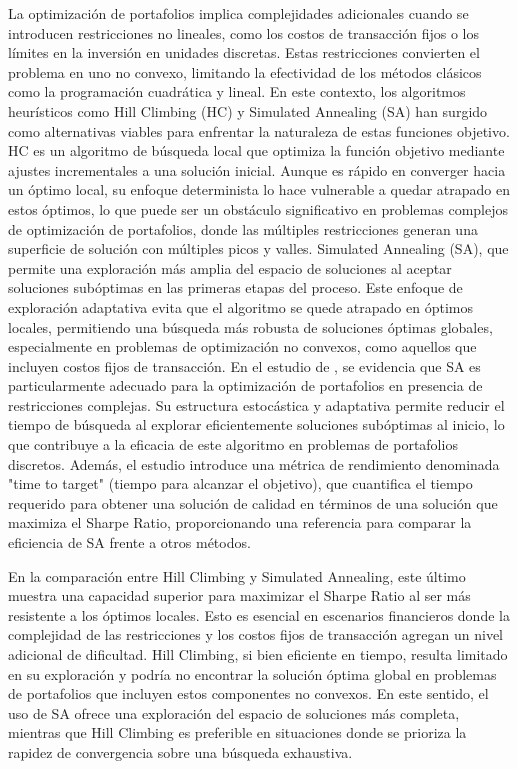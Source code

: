 \documentclass[9pt,a4paper,twoside]{rho-class/rho}
\begin{document}
        La optimización de portafolios implica complejidades adicionales cuando se introducen restricciones no lineales, como los costos de transacción fijos o los límites en la inversión en unidades discretas. Estas restricciones convierten el problema en uno no convexo, limitando la efectividad de los métodos clásicos como la programación cuadrática y lineal. En este contexto, los algoritmos heurísticos como Hill Climbing (HC) y Simulated Annealing (SA) han surgido como alternativas viables para enfrentar la naturaleza de estas funciones objetivo. HC es un algoritmo de búsqueda local que optimiza la función objetivo mediante ajustes incrementales a una solución inicial. Aunque es rápido en converger hacia un óptimo local, su enfoque determinista lo hace vulnerable a quedar atrapado en estos óptimos, lo que puede ser un obstáculo significativo en problemas complejos de optimización de portafolios, donde las múltiples restricciones generan una superficie de solución con múltiples picos y valles. Simulated Annealing (SA), que permite una exploración más amplia del espacio de soluciones al aceptar soluciones subóptimas en las primeras etapas del proceso. Este enfoque de exploración adaptativa evita que el algoritmo se quede atrapado en óptimos locales, permitiendo una búsqueda más robusta de soluciones óptimas globales, especialmente en problemas de optimización no convexos, como aquellos que incluyen costos fijos de transacción. En el estudio de \cite{Rubio-Garcia2022}, se evidencia que SA es particularmente adecuado para la optimización de portafolios en presencia de restricciones complejas. Su estructura estocástica y adaptativa permite reducir el tiempo de búsqueda al explorar eficientemente soluciones subóptimas al inicio, lo que contribuye a la eficacia de este algoritmo en problemas de portafolios discretos. Además, el estudio introduce una métrica de rendimiento denominada "time to target" (tiempo para alcanzar el objetivo), que cuantifica el tiempo requerido para obtener una solución de calidad en términos de una solución que maximiza el Sharpe Ratio, proporcionando una referencia para comparar la eficiencia de SA frente a otros métodos.
        
        En la comparación entre Hill Climbing y Simulated Annealing, este último muestra una capacidad superior para maximizar el Sharpe Ratio al ser más resistente a los óptimos locales. Esto es esencial en escenarios financieros donde la complejidad de las restricciones y los costos fijos de transacción agregan un nivel adicional de dificultad. Hill Climbing, si bien eficiente en tiempo, resulta limitado en su exploración y podría no encontrar la solución óptima global en problemas de portafolios que incluyen estos componentes no convexos. En este sentido, el uso de SA ofrece una exploración del espacio de soluciones más completa, mientras que Hill Climbing es preferible en situaciones donde se prioriza la rapidez de convergencia sobre una búsqueda exhaustiva.
        
\end{document}
